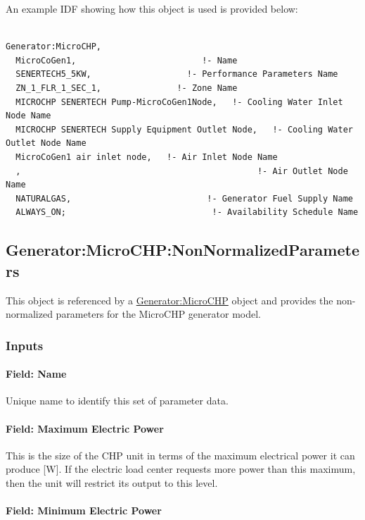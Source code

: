 An example IDF showing how this object is used is provided below:

\begin{lstlisting}

Generator:MicroCHP,
  MicroCoGen1,                         !- Name
  SENERTECH5_5KW,                   !- Performance Parameters Name
  ZN_1_FLR_1_SEC_1,               !- Zone Name
  MICROCHP SENERTECH Pump-MicroCoGen1Node,   !- Cooling Water Inlet Node Name
  MICROCHP SENERTECH Supply Equipment Outlet Node,   !- Cooling Water Outlet Node Name
  MicroCoGen1 air inlet node,   !- Air Inlet Node Name
  ,                                               !- Air Outlet Node Name
  NATURALGAS,                           !- Generator Fuel Supply Name
  ALWAYS_ON;                             !- Availability Schedule Name
\end{lstlisting}

\subsection{Generator:MicroCHP:NonNormalizedParameters}\label{generatormicrochpnonnormalizedparameters}

This object is referenced by a \hyperref[generatormicrochp]{Generator:MicroCHP} object and provides the non-normalized parameters for the MicroCHP generator model.

\subsubsection{Inputs}\label{inputs-11-003}

\paragraph{Field: Name}\label{field-name-12-002}

Unique name to identify this set of parameter data.

\paragraph{Field: Maximum Electric Power}\label{field-maximum-electric-power}

This is the size of the CHP unit in terms of the maximum electrical power it can produce {[}W{]}. If the electric load center requests more power than this maximum, then the unit will restrict its output to this level.

\paragraph{Field: Minimum Electric Power}\label{field-minimum-electric-power}

